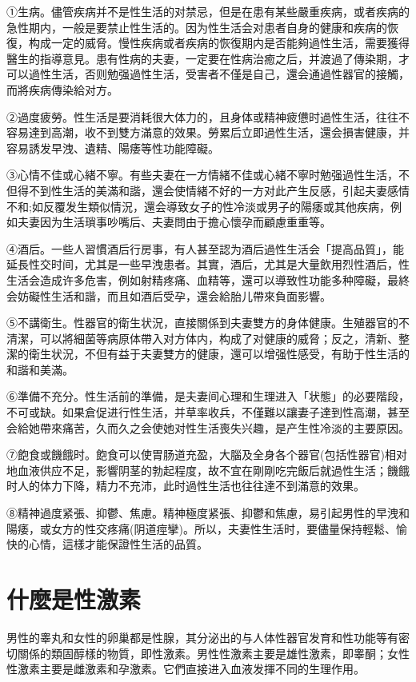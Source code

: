 \documentclass[12pt,UTF8]{ctexbook}
\begin{document}
①生病。儘管疾病并不是性生活的对禁忌，但是在患有某些嚴重疾病，或者疾病的急性期内，一般是要禁止性生活的。因为性生活会对患者自身的健康和疾病的恢復，构成一定的威脅。慢性疾病或者疾病的恢復期内是否能夠過性生活，需要獲得醫生的指導意見。患有性病的夫妻，一定要在性病治癒之后，并渡過了傳染期，才可以過性生活，否则勉强過性生活，受害者不僅是自己，還会通過性器官的接觸，而將疾病傳染給对方。

②過度疲勞。性生活是要消耗很大体力的，且身体或精神疲憊时過性生活，往往不容易達到高潮，收不到雙方滿意的效果。勞累后立即過性生活，還会損害健康，并容易誘发早洩、遺精、陽痿等性功能障礙。

③心情不佳或心緒不寧。有些夫妻在一方情緒不佳或心緒不寧时勉强過性生活，不但得不到性生活的美滿和諧，還会使情緒不好的一方对此产生反感，引起夫妻感情不和;如反覆发生類似情況，還会導致女子的性冷淡或男子的陽痿或其他疾病，例如夫妻因为生活瑣事吵嘴后、夫妻問由于擔心懷孕而顧慮重重等。

④酒后。一些人習慣酒后行房事，有人甚至認为酒后過性生活会「提高品質」，能延長性交时间，尤其是一些早洩患者。其實，酒后，尤其是大量飲用烈性酒后，性生活会造成许多危害，例如射精疼痛、血精等，還可以導致性功能多种障礙，最終会妨礙性生活和諧，而且如酒后受孕，還会給胎儿帶來負面影響。

⑤不講衛生。性器官的衛生状況，直接關係到夫妻雙方的身体健康。生殖器官的不清潔，可以將細菌等病原体帶入对方体内，构成了对健康的威脅；反之，清新、整潔的衛生状況，不但有益于夫妻雙方的健康，還可以增强性感受，有助于性生活的和諧和美滿。

⑥準備不充分。性生活前的準備，是夫妻间心理和生理进入「状態」的必要階段，不可或缺。如果倉促进行性生活，并草率收兵，不僅難以讓妻子達到性高潮，甚至会給她帶來痛苦，久而久之会使她对性生活喪失兴趣，是产生性冷淡的主要原因。

⑦飽食或饑餓时。飽食可以使胃肠道充盈，大腦及全身各个器官(包括性器官)相对地血液供应不足，影響阴茎的勃起程度，故不宜在剛剛吃完飯后就過性生活；饑餓时人的体力下降，精力不充沛，此时過性生活也往往達不到滿意的效果。

⑧精神過度紧張、抑鬱、焦慮。精神極度紧張、抑鬱和焦慮，易引起男性的早洩和陽痿，或女方的性交疼痛(阴道痙攣)。所以，夫妻性生活时，要儘量保持輕鬆、愉快的心情，這樣才能保證性生活的品質。

\section{什麼是性激素}

男性的睾丸和女性的卵巢都是性腺，其分泌出的与人体性器官发育和性功能等有密切關係的類固醇樣的物質，即性激素。男性性激素主要是雄性激素，即睾酮；女性性激素主要是雌激素和孕激素。它們直接进入血液发揮不同的生理作用。
\end{document}
